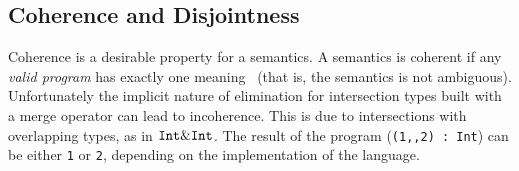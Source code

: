 \begin{comment}
\paragraph{Merge vs Pairs}
The significant difference between intersection types with a
merge operator and regular pairs is in the elimination construct. 
With pairs there are explicit eliminators (\lstinline{fst} and
\lstinline{snd}), and these eliminators must be used to extract the
components of the right type.
With intersection types and a merge operator, elminators are implicit in the language,
meaning no uses of projection functions are necessary.
\end{comment}






\subsection{Coherence and Disjointness}
\label{subsec:coherence}
Coherence is a desirable property for a semantics. 
A semantics is coherent if any \emph{valid program} has exactly one
meaning~\cite{reynolds1991coherence} (that is, the semantics is not ambiguous).
Unfortunately the implicit nature of elimination for intersection
types built with a merge operator can lead to incoherence.
This is due to intersections with overlapping types, as in
$\texttt{Int} \& \texttt{Int}$.
The result of the program (\lstinline$(1,,2) : Int$)
can be either \lstinline$1$ or \lstinline$2$, depending on the implementation 
of the language.

